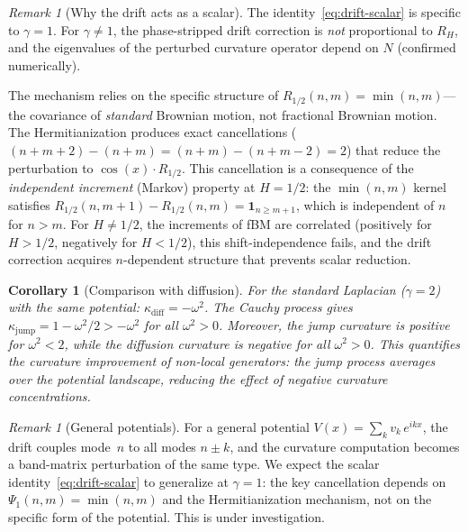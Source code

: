 \documentclass[11pt,a4paper]{article}
\theoremstyle{plain}
\newtheorem{corollary}[theorem]{Corollary}
\theoremstyle{definition}
\theoremstyle{remark}
\newtheorem{remark}[theorem]{Remark}
\begin{document}
\begin{remark}[Why the drift acts as a scalar]
\label{rem:drift-scalar}
The identity~\eqref{eq:drift-scalar} is specific to $\gamma = 1$.
For $\gamma \neq 1$, the phase-stripped drift correction is
\emph{not} proportional to $R_H$, and the eigenvalues of the
perturbed curvature operator depend on $N$ (confirmed numerically).

The mechanism relies on the specific structure of
$R_{1/2}(n,m) = \min(n,m)$---the covariance of
\emph{standard} Brownian motion, not fractional Brownian motion.
The Hermitianization produces exact cancellations
($(n{+}m{+}2)-(n{+}m) = (n{+}m)-(n{+}m{-}2) = 2$) that
reduce the perturbation to $\cos(x) \cdot R_{1/2}$.
This cancellation is a consequence of the
\emph{independent increment} (Markov) property at $H = 1/2$:
the $\min(n,m)$ kernel satisfies
$R_{1/2}(n,m{+}1) - R_{1/2}(n,m) = \mathbf{1}_{n \geq m+1}$,
which is independent of $n$ for $n > m$.
For $H \neq 1/2$, the increments of fBM are correlated
(positively for $H > 1/2$, negatively for $H < 1/2$),
this shift-independence fails, and the drift correction
acquires $n$-dependent structure that prevents scalar reduction.
\end{remark}

\begin{corollary}[Comparison with diffusion]\label{cor:comparison}
For the standard Laplacian ($\gamma = 2$) with the same potential:
$\kappa_{\mathrm{diff}} = -\omega^2$.
The Cauchy process gives
$\kappa_{\mathrm{jump}} = 1 - \omega^2/2 > -\omega^2$
for all $\omega^2 > 0$.  Moreover, the jump curvature is
positive for $\omega^2 < 2$, while the diffusion curvature
is negative for all $\omega^2 > 0$.  This quantifies the
curvature improvement of non-local generators: the jump process
averages over the potential landscape, reducing the effect of
negative curvature concentrations.
\end{corollary}

\begin{remark}[General potentials]\label{rem:potential-general}
For a general potential $V(x) = \sum_k v_k\,e^{ikx}$, the drift
couples mode~$n$ to all modes $n \pm k$, and the curvature
computation becomes a band-matrix perturbation of the same type.
We expect the scalar identity~\eqref{eq:drift-scalar} to
generalize at $\gamma = 1$: the key cancellation depends on
$\Psi_1(n,m) = \min(n,m)$ and the Hermitianization mechanism,
not on the specific form of the potential. This is under
investigation.
\end{remark}
\end{document}
